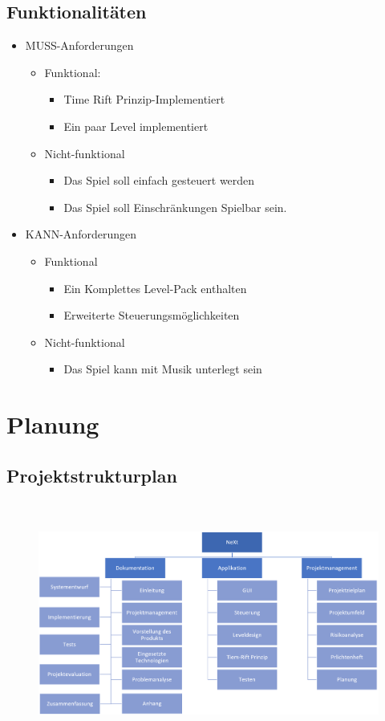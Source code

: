 \subsection{Funktionalitäten}
\begin{itemize}
	\item MUSS-Anforderungen
	\begin{itemize}
		\item Funktional:
		\begin{itemize}
			\item Time Rift Prinzip-Implementiert
			\item Ein paar Level implementiert
		\end{itemize}
		\item Nicht-funktional
		\begin{itemize}
			\item Das Spiel soll einfach gesteuert werden
			\item Das Spiel soll Einschränkungen Spielbar sein.
		\end{itemize}
	\end{itemize}
	\item KANN-Anforderungen
	\begin{itemize}
		\item Funktional
		\begin{itemize}
			\item Ein Komplettes Level-Pack enthalten
			\item Erweiterte Steuerungsmöglichkeiten 
		\end{itemize}
		\item Nicht-funktional
		\begin{itemize}
			\item Das Spiel kann mit Musik unterlegt sein
		\end{itemize}
	\end{itemize}
\end{itemize}
\section{Planung}
\subsection{Projektstrukturplan}
\begin{figure}[H]
	\centering
	\includegraphics[width=16cm,height=8cm]{images/Projektstrukturplan.png}
	\label{Projektstrukturplan}
\end{figure}

